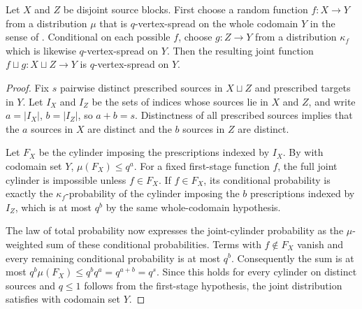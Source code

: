 \begin{lemma}
Let $X$ and $Z$ be disjoint source blocks.  First choose a random function $f:X\to Y$ from a distribution $\mu$ that is $q$-vertex-spread on the whole codomain $Y$ in the sense of .  Conditional on each possible $f$, choose $g:Z\to Y$ from a distribution $\kappa_f$ which is likewise $q$-vertex-spread on $Y$.  Then the resulting joint function $f\sqcup g:X\sqcup Z\to Y$ is $q$-vertex-spread on $Y$.
\end{lemma}
\begin{proof}
Fix $s$ pairwise distinct prescribed sources in $X\sqcup Z$ and prescribed targets in $Y$.  Let $I_X$ and $I_Z$ be the sets of indices whose sources lie in $X$ and $Z$, and write $a=|I_X|$, $b=|I_Z|$, so $a+b=s$.  Distinctness of all prescribed sources implies that the $a$ sources in $X$ are distinct and the $b$ sources in $Z$ are distinct.

Let $F_X$ be the cylinder imposing the prescriptions indexed by $I_X$.  By  with codomain set $Y$, $\mu(F_X)\leq q^a$.  For a fixed first-stage function $f$, the full joint cylinder is impossible unless $f\in F_X$.  If $f\in F_X$, its conditional probability is exactly the $\kappa_f$-probability of the cylinder imposing the $b$ prescriptions indexed by $I_Z$, which is at most $q^b$ by the same whole-codomain hypothesis.

The law of total probability now expresses the joint-cylinder probability as the $\mu$-weighted sum of these conditional probabilities.  Terms with $f\notin F_X$ vanish and every remaining conditional probability is at most $q^b$.  Consequently the sum is at most $q^b\mu(F_X)\leq q^bq^a=q^{a+b}=q^s$.  Since this holds for every cylinder on distinct sources and $q\leq1$ follows from the first-stage hypothesis, the joint distribution satisfies  with codomain set $Y$.
\end{proof}
